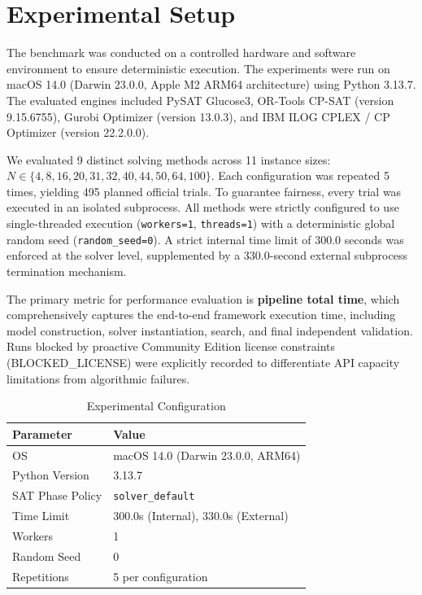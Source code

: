 \section{Experimental Setup}
\label{sec:experimental_setup}

The benchmark was conducted on a controlled hardware and software environment to ensure deterministic execution. The experiments were run on macOS 14.0 (Darwin 23.0.0, Apple M2 ARM64 architecture) using Python 3.13.7. 
The evaluated engines included PySAT Glucose3, OR-Tools CP-SAT (version 9.15.6755), Gurobi Optimizer (version 13.0.3), and IBM ILOG CPLEX / CP Optimizer (version 22.2.0.0).

We evaluated 9 distinct solving methods across 11 instance sizes: $N \in \{4, 8, 16, 20, 31, 32, 40, 44, 50, 64, 100\}$. Each configuration was repeated 5 times, yielding 495 planned official trials.
To guarantee fairness, every trial was executed in an isolated subprocess. All methods were strictly configured to use single-threaded execution (\texttt{workers=1}, \texttt{threads=1}) with a deterministic global random seed (\texttt{random\_seed=0}). A strict internal time limit of 300.0 seconds was enforced at the solver level, supplemented by a 330.0-second external subprocess termination mechanism.

The primary metric for performance evaluation is \textbf{pipeline total time}, which comprehensively captures the end-to-end framework execution time, including model construction, solver instantiation, search, and final independent validation.
Runs blocked by proactive Community Edition license constraints (BLOCKED\_LICENSE) were explicitly recorded to differentiate API capacity limitations from algorithmic failures.

\begin{table}[h]
\centering
\caption{Experimental Configuration}
\begin{tabular}{@{}ll@{}}
\toprule
Parameter & Value \\
\midrule
OS & macOS 14.0 (Darwin 23.0.0, ARM64) \\
Python Version & 3.13.7 \\
SAT Phase Policy & \texttt{solver\_default} \\
Time Limit & 300.0s (Internal), 330.0s (External) \\
Workers & 1 \\
Random Seed & 0 \\
Repetitions & 5 per configuration \\
\bottomrule
\end{tabular}
\label{tab:config}
\end{table}

